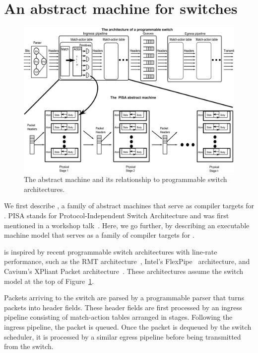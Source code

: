 \section{An abstract machine for switches}
\label{s:absmachine}

\begin{figure}[!t]
  \includegraphics[width=\textwidth]{pisa.pdf}
  \caption{The \absmachine abstract machine and its relationship to
  programmable switch architectures.}
  \label{fig:switch}
\end{figure}

We first describe \absmachine, a family of abstract machines that serve as
compiler targets for \pktlanguage. PISA stands for Protocol-Independent Switch
Architecture and was first mentioned in a workshop talk~\cite{nick_p4}. Here,
we go further, by describing an executable machine model that serves as a family
of compiler targets for \pktlanguage.

\absmachine is inspired by recent programmable switch architectures with
line-rate performance, such as the RMT architecture~\cite{rmt}, Intel's
FlexPipe~\cite{flexpipe} architecture, and Cavium's XPliant Packet
architecture~\cite{xpliant}. These architectures assume the switch model at the
top of Figure~\ref{fig:switch}.

Packets arriving to the switch are parsed by a programmable parser that turns
packets into header fields. These header fields are first processed by an
ingress pipeline consisting of match-action tables arranged in stages.
Following the ingress pipeline, the packet is queued. Once the packet is
dequeued by the switch scheduler, it is processed by a similar egress pipeline
before being transmitted from the switch.

